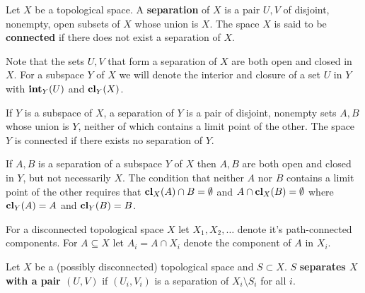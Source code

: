 
\begin{definition}
  Let $X$ be a topological space. A \textbf{separation} of $X$ is a pair $U, V$ of disjoint, nonempty, open subsets of $X$ whose union is $X$.
  The space $X$ is said to be \textbf{connected} if there does not exist a separation of $X$.
\end{definition}

Note that the sets $U, V$ that form a separation of $X$ are both open and closed in $X$.
For a subspace $Y$ of $X$ we will denote the interior and closure of a set $U$ in $Y$ with $\mathbf{int}_Y(U)$ and $\mathbf{cl}_Y(X)$.

\begin{lemma}
  If $Y$ is a subspace of $X$, a separation of $Y$ is a pair of disjoint, nonempty sets $A, B$ whose union is $Y$, neither of which contains a limit point of the other.
  The space $Y$ is connected if there exists no separation of $Y$.
\end{lemma}

If $A, B$ is a separation of a subspace $Y$ of $X$ then $A, B$ are both open and closed in $Y$, but not necessarily $X$.
The condition that neither $A$ nor $B$ contains a limit point of the other requires that $\mathbf{cl}_X(A)\cap B = \emptyset$ and $A\cap \mathbf{cl}_X(B) =\emptyset$ where $\mathbf{cl}_Y(A) = A$ and $\mathbf{cl}_Y(B) = B$.


For a disconnected topological space $X$ let $X_1, X_2, \ldots$ denote it's path-connected components.
For $A\subseteq X$ let $A_i = A\cap X_i$ denote the component of $A$ in $X_i$.

\begin{definition}
  Let $X$ be a (possibly disconnected) topological space and $S\subset X$.
  $S$ \textbf{separates $X$ with a pair $(U, V)$} if $(U_i, V_i)$ is a separation of $X_i\setminus S_i$ for all $i$.
\end{definition}


